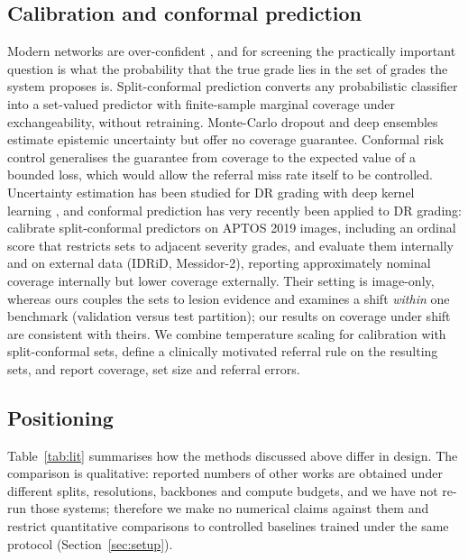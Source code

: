 \subsection{Calibration and conformal prediction}
Modern networks are over-confident \citep{guo2017calibration}, and for screening the practically important question is what the probability that the true grade lies in the set of grades the system proposes is. Split-conformal prediction \citep{vovk2005,angelopoulos2023} converts any probabilistic classifier into a set-valued predictor with finite-sample marginal coverage under exchangeability, without retraining. Monte-Carlo dropout \citep{gal2016dropout} and deep ensembles estimate epistemic uncertainty but offer no coverage guarantee. Conformal risk control \citep{angelopoulos2024crc} generalises the guarantee from coverage to the expected value of a bounded loss, which would allow the referral miss rate itself to be controlled. Uncertainty estimation has been studied for DR grading with deep kernel learning \citep{siebert2023dkl}, and conformal prediction has very recently been applied to DR grading: \citet{hasan2026ordinalcp} calibrate split-conformal predictors on APTOS 2019 images, including an ordinal score that restricts sets to adjacent severity grades, and evaluate them internally and on external data (IDRiD, Messidor-2), reporting approximately nominal coverage internally but lower coverage externally. Their setting is image-only, whereas ours couples the sets to lesion evidence and examines a shift \emph{within} one benchmark (validation versus test partition); our results on coverage under shift are consistent with theirs. We combine temperature scaling for calibration with split-conformal sets, define a clinically motivated referral rule on the resulting sets, and report coverage, set size and referral errors.

\subsection{Positioning}
Table~\ref{tab:lit} summarises how the methods discussed above differ in design. The comparison is qualitative: reported numbers of other works are obtained under different splits, resolutions, backbones and compute budgets, and we have not re-run those systems; therefore we make no numerical claims against them and restrict quantitative comparisons to controlled baselines trained under the same protocol (Section~\ref{sec:setup}).

